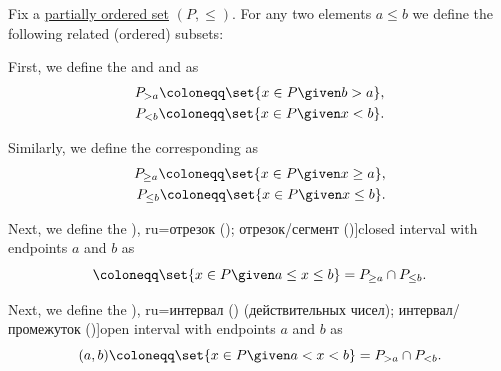 \begin{definition}\label{def:order_interval}
  Fix a \hyperref[def:partially_ordered_set]{partially ordered set} \( (P, \leq) \). For any two elements \( a \leq b \) we define the following related (ordered) subsets:

  \begin{thmenum}
     First, we define the  and  and as
    \begin{equation*}
      \begin{aligned}
        P_{>a} \coloneqq \set{ x \in P \given b > a },
        \\
        P_{<b} \coloneqq \set{ x \in P \given x < b }.
      \end{aligned}
    \end{equation*}

    Similarly, we define the corresponding  as
    \begin{equation*}
      \begin{aligned}
        P_{\geq a} \coloneqq \set{ x \in P \given x \geq a },
        \\
        P_{\leq b} \coloneqq \set{ x \in P \given x \leq b }.
      \end{aligned}
    \end{equation*}

     Next, we define the \term[bg=затворен интервал (от реални числа) (\cite[39]{Тагамлицки1971ДиференциалноСмятане}), ru=отрезок (\cite[82]{Проскуряков1951ТеоретическиеОсновыАрифметики}); отрезок/сегмент (\cite[def. 6]{Александров1977ОбщаяТопология})]{closed interval} with endpoints \( a \) and \( b \) as
    \begin{equation*}
      [a, b] \coloneqq \set{ x \in P \given a \leq x \leq b } = P_{\geq a} \cap P_{\leq b}.
    \end{equation*}

     Next, we define the \term[bg=отворен интервал (от реални числа) (\cite[39]{Тагамлицки1971ДиференциалноСмятане}), ru=интервал (\cite[82]{Проскуряков1951ТеоретическиеОсновыАрифметики}) (действительных чисел); интервал/промежуток (\cite[def. 6]{Александров1977ОбщаяТопология})]{open interval} with endpoints \( a \) and \( b \) as
    \begin{equation*}
      (a, b) \coloneqq \set{ x \in P \given a < x < b } = P_{> a} \cap P_{< b}.
    \end{equation*}


\end{thmenum}
\end{definition}
